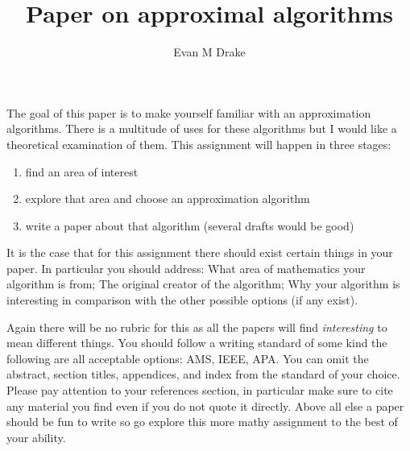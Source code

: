 \documentclass[12pt]{article}
\title{Paper on approximal algorithms}
\author{
	Evan M Drake \\
	\texttt{}
}
\begin{document}
	\maketitle


	The goal of this paper is to make yourself familiar with an approximation algorithms.
	There is a multitude of uses for these algorithms but I would like a theoretical examination of them.
	This assignment will happen in three stages:
	\begin{enumerate}
		\item find an area of interest
		\item explore that area and choose an approximation algorithm
		\item write a paper about that algorithm (several drafts would be good)
	\end{enumerate}
	It is the case that for this assignment there should exist certain things in your paper.
	In particular you should address:
		What area of mathematics your algorithm is from;
		The original creator of the algorithm;
		Why your algorithm is interesting in comparison with the other possible options (if any exist).
	
	Again there will be no rubric for this as all the papers will find \textit{interesting} to mean different things.
	You should follow a writing standard of some kind the following are all acceptable options: AMS, IEEE, APA.
	You can omit the abstract, section titles, appendices, and index from the standard of your choice.
	Please pay attention to your references section,
		in particular make sure to cite any material you find even if you do not quote it directly.
	Above all else a paper should be fun to write so go explore this more mathy assignment to the best of your ability.


	\nocite{*}

	\newpage %
	\backmatter
\end{document}
